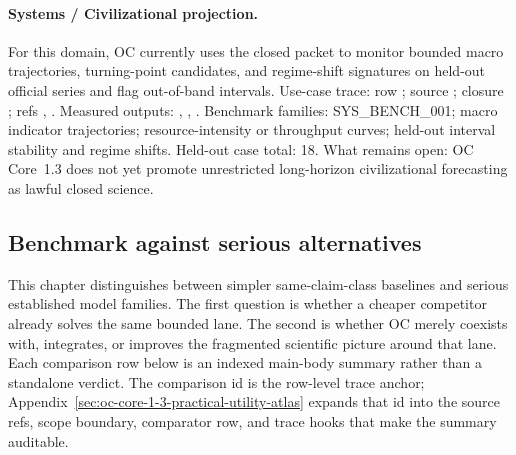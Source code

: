 \paragraph{Systems / Civilizational projection.}
For this domain, OC currently uses the closed packet to monitor bounded macro trajectories, turning-point candidates, and regime-shift signatures on held-out official series and flag out-of-band intervals.
Use-case trace: row ; \allowbreak source ; \allowbreak closure ; \allowbreak refs , \allowbreak {}.
Measured outputs: , , .
Benchmark families: SYS\_BENCH\_001; macro indicator trajectories; resource-intensity or throughput curves; held-out interval stability and regime shifts.
Held-out case total: 18.
What remains open: OC Core~1.3 does not yet promote unrestricted long-horizon civilizational forecasting as lawful closed science.

\subsection{Benchmark against serious alternatives}
This chapter distinguishes between simpler same-claim-class baselines and serious established model families. The first question is whether a cheaper competitor already solves the same bounded lane. The second is whether OC merely coexists with, integrates, or improves the fragmented scientific picture around that lane.
Each comparison row below is an indexed main-body summary rather than a standalone verdict. The comparison id is the row-level trace anchor; Appendix~\ref{sec:oc-core-1-3-practical-utility-atlas} expands that id into the source refs, scope boundary, comparator row, and trace hooks that make the summary auditable.

